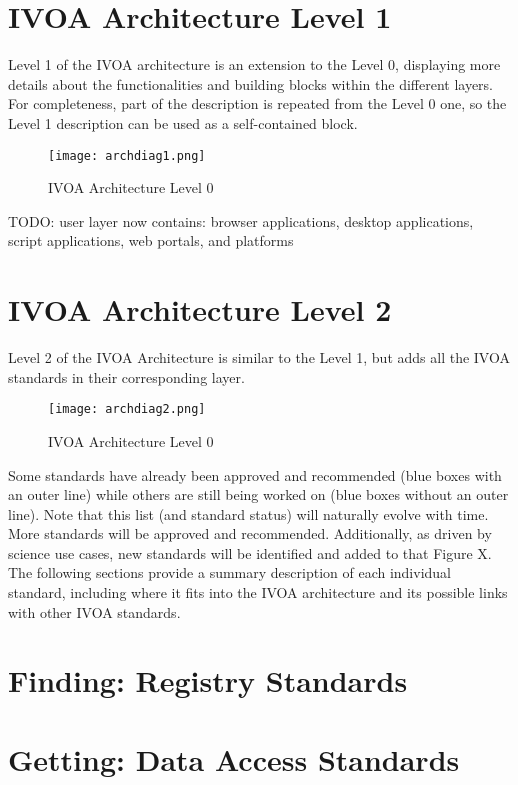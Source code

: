 \documentclass[11pt,a4paper]{ivoa}
\begin{document}
\section{IVOA Architecture Level 1}

Level 1 of the IVOA architecture is an extension to the Level 0, displaying more details about the functionalities and building blocks within the different layers. For completeness,  part  of  the  description  is  repeated  from  the  Level  0  one,  so  the  Level 1 description can be used as a self-contained block.

\begin{figure}
\centering
\texttt{[image: archdiag1.png]}
\caption{IVOA Architecture Level 0}
\label{fig:architecture}
\end{figure}

TODO: user layer now contains: browser applications, desktop applications, script applications, web portals, and platforms

\section{IVOA Architecture Level 2}

Level 2 of the IVOA Architecture is similar to the Level 1, but adds all the IVOA standards in  their corresponding layer.

\begin{figure}
\centering
\texttt{[image: archdiag2.png]}
\caption{IVOA Architecture Level 0}
\label{fig:architecture}
\end{figure}

Some  standards  have  already  been  approved and recommended (blue boxes with an outer line) while others are still being worked on (blue boxes without an outer line). Note that this list  (and standard  status) will naturally evolve with time. More standards will be approved and recommended. Additionally, as driven by science use cases, new standards will be identified and added to that Figure X. The following sections provide a summary description of each individual standard, including where it fits into the IVOA architecture and its possible links with other IVOA standards.

\section{Finding: Registry Standards}

\section{Getting: Data Access Standards}
\end{document}
